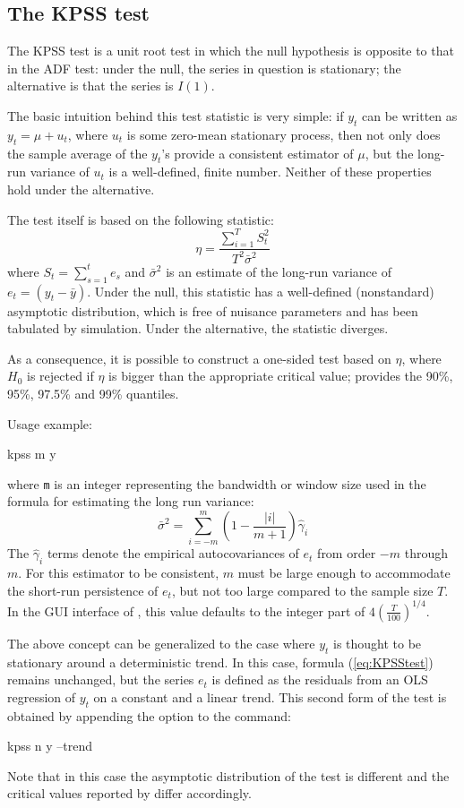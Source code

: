 \subsection{The KPSS test}
\label{sec:KPSStest}

The KPSS test \citep{KPSS92} is a unit root test in which the null
hypothesis is opposite to that in the ADF test: under the null, the
series in question is stationary; the alternative is that the series
is $I(1)$.

The basic intuition behind this test statistic is very simple: if
$y_t$ can be written as $y_t = \mu + u_t$, where $u_t$ is some
zero-mean stationary process, then not only does the sample average of
the $y_t$'s provide a consistent estimator of $\mu$, but the long-run
variance of $u_t$ is a well-defined, finite number. Neither of these
properties hold under the alternative.

The test itself is based on the following statistic:
\begin{equation}
  \label{eq:KPSStest}
  \eta = \frac{\sum_{i=1}^T S_t^2 }{ T^2 \bar{\sigma}^2 }
\end{equation}
where $S_t = \sum_{s=1}^t e_s$ and $\bar{\sigma}^2$ is an estimate of
the long-run variance of $e_t = (y_t - \bar{y})$. Under the null, this
statistic has a well-defined (nonstandard) asymptotic distribution,
which is free of nuisance parameters and has been tabulated by
simulation. Under the alternative, the statistic diverges.

As a consequence, it is possible to construct a one-sided test based
on $\eta$, where $H_0$ is rejected if $\eta$ is bigger than the
appropriate critical value;  provides the 90\%, 95\%,
97.5\% and 99\% quantiles.

Usage example:
\begin{code}
kpss m y
\end{code}
where \verb|m| is an integer representing the bandwidth or window
size used in the formula for estimating the long run variance:
\[
  \bar{\sigma}^2 = \sum_{i=-m}^m \left( 1 - \frac{|i|}{m+1} \right) \hat{\gamma}_i
\]
The $\hat{\gamma}_i$ terms denote the empirical autocovariances of
$e_t$ from order $-m$ through $m$.  For this estimator to be
consistent, $m$ must be large enough to accommodate the short-run
persistence of $e_t$, but not too large compared to the sample size
$T$.  In the GUI interface of , this value defaults to the
integer part of $4 \left( \frac{T}{100} \right)^{1/4}$.

The above concept can be generalized to the case where $y_t$ is
thought to be stationary around a deterministic trend. In this case,
formula (\ref{eq:KPSStest}) remains unchanged, but the series $e_t$ is
defined as the residuals from an OLS regression of $y_t$ on a constant
and a linear trend. This second form of the test is obtained by
appending the  option to the  command:
\begin{code}
kpss n y --trend
\end{code}
Note that in this case the asymptotic distribution of the test is
different and the critical values reported by  differ
accordingly.


